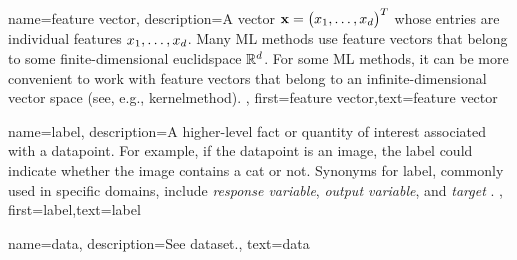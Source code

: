{name={feature vector},
	description={A vector ${\bf x} = \big(x_{1},\ldots,x_{d}\big)^{T}$ 
	whose entries are individual \gls{feature}s $x_{1},\ldots,x_{d}$. Many ML methods 
	use feature vectors that belong to some finite-dimensional \gls{euclidspace} $\mathbb{R}^{d}$. 
	For some ML methods, it can be more convenient to work with feature 
	vectors that belong to an infinite-dimensional vector space (see, e.g., \gls{kernelmethod}). 
		}, first={feature vector},text={feature vector}  
}


{name={label},
	description={A higher-level fact or quantity of interest associated with a \gls{datapoint}. 
		For example, if the \gls{datapoint} is an image, the label could indicate whether the 
		image contains a cat or not. Synonyms for label, commonly used in specific domains, 
		include \emph{response variable}, \emph{output variable}, and \emph{target} \cite{Gujarati2021,Dodge2003,Everitt2022}.
 },
	first={label},text={label}  
}


{name={data},
	 description={See \gls{dataset}.},
	text={data}
}

